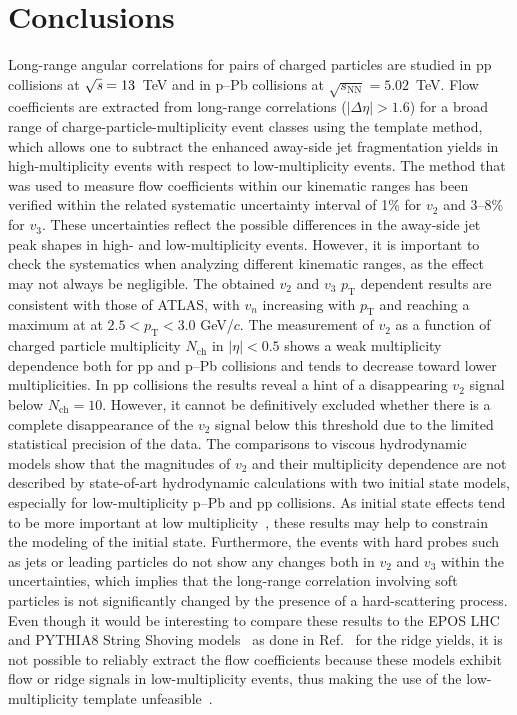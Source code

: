 
\section{Conclusions}
\label{sec:summary}
Long-range angular correlations for pairs of charged particles are studied in pp collisions at ${\sqrt{{\textit s}}}=13$~TeV and in p--Pb collisions at $\sqrt{s_\mathrm{NN}} = 5.02$~TeV. Flow coefficients are extracted from long-range correlations ($|\Delta\eta| > 1.6$) for a broad range of charge-particle-multiplicity event classes using the template method, which allows one to subtract the enhanced away-side jet fragmentation yields in high-multiplicity events with respect to low-multiplicity events. The method that was used to measure flow coefficients within our kinematic ranges has been verified within the related systematic uncertainty interval of 1\% for $v_{2}$ and 3--8\% for $v_{3}$. These uncertainties reflect the possible differences in the away-side jet peak shapes in high- and low-multiplicity events. However, it is important to check the systematics when analyzing different kinematic ranges, as the effect may not always be negligible.
The obtained $v_2$ and $v_3$ $p_\mathrm{T}$ dependent results are consistent with those of ATLAS, with $v_n$ increasing with $p_\mathrm{T}$ and reaching a maximum at at $2.5<p_\mathrm{T}<3.0$ GeV/$c$. 
The measurement of $v_2$ as a function of charged particle multiplicity $N_{\mathrm{ch}}$ in $|\eta|<0.5$ shows a weak multiplicity dependence both for pp and p--Pb collisions and tends to decrease toward lower multiplicities. In pp collisions the results reveal a hint of a disappearing $v_2$ signal below $N_{\mathrm{ch}} = 10$. However, it cannot be definitively excluded whether there is a complete disappearance of the $v_2$ signal below this threshold due to the limited statistical precision of the data.
The comparisons to viscous hydrodynamic models show that the magnitudes of $v_2$ and their multiplicity dependence are not described by state-of-art hydrodynamic calculations with two initial state models, especially for low-multiplicity p--Pb and pp collisions. As initial state effects tend to be more important at low multiplicity~\cite{Greif:2017bnr,Moreland:2018gsh}, these results may help to constrain the modeling of the initial state.
Furthermore, the events with hard probes such as jets or leading particles do not show any changes both in $v_2$ and $v_3$ within the uncertainties, which implies that the long-range correlation involving soft particles is not significantly changed by the presence of a hard-scattering process. Even though it would be interesting to compare these results to the EPOS LHC~\cite{Pierog:2013ria} and PYTHIA8 String Shoving models~\cite{Bierlich:2017vhg,Bierlich:2019ixq} as done in Ref.~\cite{ALICE:2012eyl} for the ridge yields, it is not possible to reliably extract the flow coefficients because these models exhibit flow or ridge signals in low-multiplicity events, thus making the use of the low-multiplicity template unfeasible~\cite{Ji:2023eqn}.

